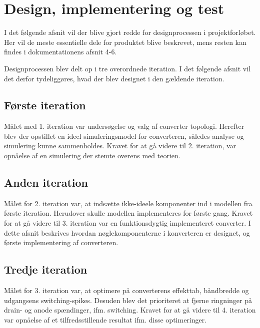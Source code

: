 \chapter{Design, implementering og test}
I det følgende afsnit vil der blive gjort redde for designprocessen i projektforløbet. Her vil de meste essentielle dele for produktet blive beskrevet, mens resten kan findes i dokumentationens afsnit 4-6.

Designprocessen blev delt op i tre overordnede iteration. I det følgende afsnit vil det derfor tydeliggøres, hvad der blev designet i den gældende iteration. 


\section{Første iteration}
Målet med 1. iteration var undersøgelse og valg af converter topologi. Herefter blev der opstillet en ideel simuleringsmodel for converteren, således analyse og simulering kunne sammenholdes. 
Kravet for at gå videre til 2. iteration, var opnåelse af en simulering der stemte overens med teorien. 





\section{Anden iteration}
Målet for 2. iteration var, at indsætte ikke-ideele komponenter ind i modellen fra første iteration. Herudover skulle modellen implementeres for første gang. 
Kravet for at gå videre til 3. iteration var en funktionsdygtig implementeret converter. 
I dette afsnit beskrives hvordan nøglekomponenterne i konverteren er designet, og første implementering af converteren.













\section{Tredje iteration}
Målet for 3. iteration var, at optimere på converterens effekttab, båndbredde og udgangsens switching-spikes. Desuden blev det prioriteret at fjerne ringninger på drain- og anode spændinger, ifm. switching.
Kravet for at gå videre til 4. iteration var opnåelse af et tilfredsstillende resultat ifm. disse optimeringer.

